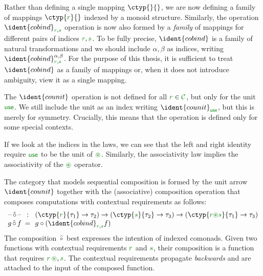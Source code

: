 \noindent
Rather than defining a single mapping $\ctyp{}{}$, we are now defining a family of mappings 
$\ctyp{\cclrd{r}}{}$ indexed by a monoid structure. Similarly, the operation $\ident{cobind}_{\cclrd{r}, \cclrd{s}}$ 
operation is now also formed by a \emph{family} of mappings for different pairs of indices 
$\cclrd{r}, \cclrd{s}$. To be fully precise, $\ident{cobind}$ is a family of natural transformations 
and we should include $\alpha, \beta$ as indices, writing $\ident{cobind}_{\cclrd{r},\cclrd{s}}^{\alpha, \beta}$.
For the purpose of this thesis, it is sufficient to treat $\ident{cobind}$ as a family of
mappings or, when it does not  introduce ambiguity, view it as a single mapping.

The $\ident{counit}$ operation is not defined for all $\cclrd{r} \in \C$, but only for 
the unit $\cunit$. We still include the unit as an index writing $\ident{counit}_{\cunit}$, 
but this is merely for symmetry. Crucially, this means that the operation is defined only
for some special contexts.

If we look at the indices in the laws, we can see that the left and right identity 
require $\cunit$ to be the unit of $\cseq$. Similarly, the associativity law implies the 
associativity of the $\cseq$ operator. 

The category that models sequential composition is formed by the unit arrow $\ident{counit}$ 
together with the (associative) composition operation that composes computations with 
contextual requirements as follows:
%
\begin{equation*}
\begin{array}{ccl}
\textnormal{--}\, \hat{\circ} \,\textnormal{--}&\narrow{:}& (\ctyp{\cclrd{r}}{\tau_1} \rightarrow \tau_2) 
  \rightarrow (\ctyp{\cclrd{s}}{\tau_2} \rightarrow \tau_3) 
  \rightarrow (\ctyp{\cclrd{r} \cseq \cclrd{s}}{\tau_1} \rightarrow \tau_3) \\
g \, \hat{\circ} \, f &\narrow{=}& g \circ (\ident{cobind}_{\cclrd{r}, \cclrd{s}} f)
\end{array}
\end{equation*}
%
The composition $\hat{\circ}$ best expresses the intention of indexed comonads. Given two functions
with contextual requirements $\cclrd{r}$ and $\cclrd{s}$, their composition is a function that 
requires $\cclrd{r}\,\cseq,\cclrd{s}$. The contextual requirements propagate \emph{backwards} and
are attached to the input of the composed function.


